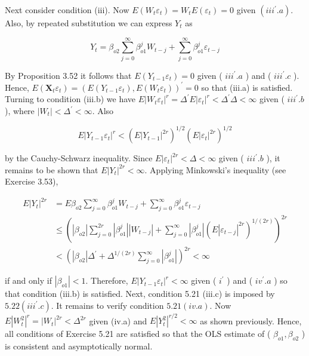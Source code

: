 \documentclass[10pt]{article}
\begin{document}
Next consider condition (iii). Now $E\left(W_{t} \varepsilon_{t}\right)=W_{t} E\left(\varepsilon_{t}\right)=0$ given $\left(i i i^{\prime} . a\right)$. Also, by repeated substitution we can express $Y_{t}$ as

$$
Y_{t}=\beta_{o 2} \sum_{j=0}^{\infty} \beta_{o 1}^{j} W_{t-j}+\sum_{j=0}^{\infty} \beta_{o 1}^{j} \varepsilon_{t-j}
$$

By Proposition 3.52 it follows that $E\left(Y_{t-1} \varepsilon_{t}\right)=0$ given ( $i i i^{\prime} . a$ ) and ( $i i i^{\prime} . c$ ). Hence, $E\left(\mathbf{X}_{t} \varepsilon_{t}\right)=\left(E\left(Y_{t-1} \varepsilon_{t}\right), E\left(W_{t} \varepsilon_{t}\right)\right)^{\prime}=0$ so that (iii.a) is satisfied. Turning to condition (iii.b) we have $E\left|W_{t} \varepsilon_{t}\right|^{r}=\Delta^{\prime} E\left|\varepsilon_{t}\right|^{r}<\Delta^{\prime} \Delta<\infty$ given ( $i i i^{\prime} . b$ ), where $\left|W_{t}\right|<\Delta^{\prime}<\infty$. Also

$$
E\left|Y_{t-1} \varepsilon_{t}\right|^{r}<\left(E\left|Y_{t-1}\right|^{2 r}\right)^{1 / 2}\left(E\left|\varepsilon_{t}\right|^{2 r}\right)^{1 / 2}
$$

by the Cauchy-Schwarz inequality. Since $E\left|\varepsilon_{t}\right|^{2 r}<\Delta<\infty$ given ( $i i i^{\prime} . b$ ), it remains to be shown that $E\left|Y_{t}\right|^{2 r}<\infty$. Applying Minkowski's inequality (see Exercise 3.53),

$$
\begin{aligned}
E\left|Y_{t}\right|^{2 r} & =E \beta_{o 2} \sum_{j=0}^{\infty} \beta_{o 1}^{j} W_{t-j}+\sum_{j=0}^{\infty} \beta_{o 1}^{j} \varepsilon_{t-j} \\
& \leq\left(\left|\beta_{o 2}\right| \sum_{j=0}^{2 r}\left|\beta_{o 1}^{j}\right|\left|W_{t-j}\right|+\sum_{j=0}^{\infty}\left|\beta_{o 1}^{j}\right|\left(E\left|\varepsilon_{t-j}\right|^{2 r}\right)^{1 /(2 r)}\right)^{2 r} \\
& <\left(\left|\beta_{o 2}\right| \Delta^{\prime}+\Delta^{1 /(2 r)} \sum_{j=0}^{\infty}\left|\beta_{o 1}^{j}\right|\right)^{2 r}<\infty
\end{aligned}
$$

if and only if $\left|\beta_{o 1}\right|<1$. Therefore, $E\left|Y_{t-1} \varepsilon_{t}\right|^{r}<\infty$ given ( $i^{\prime}$ ) and ( $i v^{\prime} . a$ ) so that condition (iii.b) is satisfied. Next, condition 5.21 (iii.c) is imposed by $5.22\left(i i i^{\prime} . c\right)$. It remains to verify condition $5.21(i v . a)$. Now $E\left|W_{t}^{2}\right|^{r}= \left|W_{t}\right|^{2 r}<\Delta^{2 r}$ given (iv.a) and $E\left|Y_{t}^{2}\right|^{r / 2}<\infty$ as shown previously. Hence, all conditions of Exercise 5.21 are satisfied so that the OLS estimate of ( $\beta_{o 1}, \beta_{o 2}$ ) is consistent and asymptotically normal.
\end{document}
